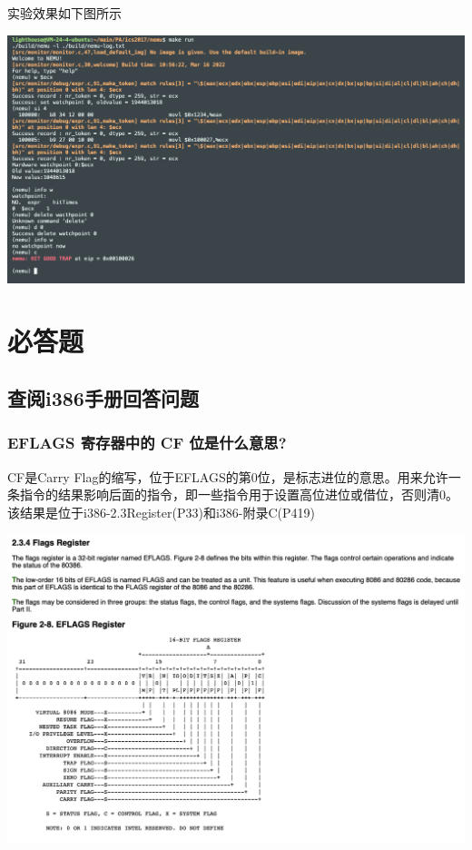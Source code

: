 \documentclass[UTF8,a4paper,10pt]{ctexart}
\begin{document}
\par 实验效果如下图所示
\begin{center}
  \includegraphics[scale = 0.3]{7}
\end{center}

\section{必答题}
\subsection{查阅i386手册回答问题}
\subsubsection{EFLAGS 寄存器中的 CF 位是什么意思?}
CF是Carry Flag的缩写，位于EFLAGS的第0位，是标志进位的意思。用来允许一条指令的结果影响后面的指令，即一些指令用于设置高位进位或借位，否则清0。
该结果是位于i386-2.3Register(P33)和i386-附录C(P419)
\begin{center}
  \includegraphics*[scale = 0.45]{8}
\end{center}
\end{document}
